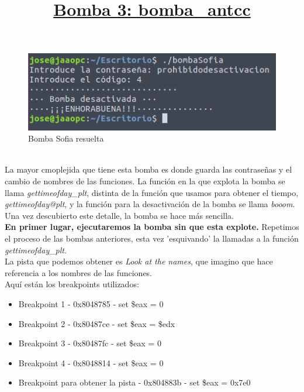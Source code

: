 \documentclass[11pt,a4paper]{article}
\begin{document}
\begin{figure}[H] 
	\centering
	\includegraphics[scale=0.45]{capturas/bombasofia3.png} 
	\caption{Bomba Sofia resuelta} \label{fig:figura25}
\end{figure}

\title{\large{\textbf{\underline{Bomba 3: bomba\_antcc}}}} \\

La mayor cmoplejida que tiene esta bomba es donde guarda las contraseñas y el cambio de nombres de las funciones. La función en la que explota la bomba se llama \emph{gettimeofday\_plt}, distinta de la función que usamos para obtener el tiempo, \emph{gettimeofday@plt}, y la función para la desactivación de la bomba se llama \emph{booom}. Una vez descubierto este detalle, la bomba se hace más sencilla. \\

\textbf{En primer lugar, ejecutaremos la bomba sin que esta explote.} Repetimos el proceso de las bombas anteriores, esta vez 'esquivando' la llamadas a la función \emph{gettimeofday\_plt}. \\
La pista que podemos obtener es \emph{Look at the names}, que imagino que hace referencia a los nombres de las funciones. \\
Aquí están los breakpoints utilizados: \\

\begin{itemize}
	\item Breakpoint 1 - 0x8048785 - set \$eax = 0
	\item Breakpoint 2 - 0x80487ce - set \$eax = \$edx
	\item Breakpoint 3 - 0x80487fc - set \$eax = 0
	\item Breakpoint 4 - 0x8048814 - set \$eax = 0
	\item Breakpoint para obtener la pista - 0x804883b - set \$eax = 0x7e0
\end{itemize}
\end{document}
